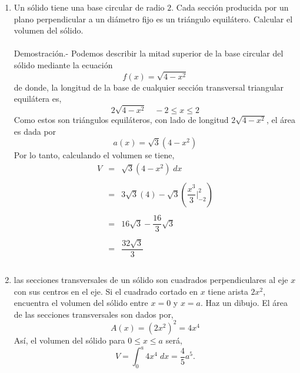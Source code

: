 \begin{enumerate}[ \bfseries 1.]
    \item Un sólido tiene una base circular de radio $2$. Cada sección producida por un plano perpendicular a un diámetro fijo es un triángulo equilátero. Calcular el volumen del sólido.\\\\
	Demostración.-\; Podemos describir la mitad superior de la base circular del sólido mediante la ecuación
	$$f(x)=\sqrt{4-x^2}$$
	de donde, la longitud de la base de cualquier sección transversal triangular equilátera es,
	$$2\sqrt{4-x^2}\quad -2\leq x \leq 2$$
	Como estos son triángulos equiláteros, con lado de longitud $2\sqrt{4-x^2}$, el área es dada por 
	$$a(x) = \sqrt{3}(4-x^2)$$
	Por lo tanto, calculando el volumen se tiene,
	$$\begin{array}{rcl}
	    V&=&\sqrt{3}(4-x^2)\; dx\\\\
	     &=&3\sqrt{3}(4) - \sqrt{3}\left(\dfrac{x^3}{3}\bigg|_{-2}^2\right)\\\\
	     &=&16\sqrt{3} - \dfrac{16}{3}\sqrt{3}\\\\
	     &=&\dfrac{32\sqrt{3}}{3}\\\\
	\end{array}$$
	\vspace{0.5cm}

    \item las secciones transversales de un sólido son cuadrados perpendiculares al eje $x$ con sus centros en el eje. Si el cuadrado cortado en $x$ tiene arista $2x^2$, encuentra el volumen del sólido entre $x = 0$ y $x = a$. Haz un dibujo.
	El área de las secciones transversales son dados por,
	$$A(x) = (2x^2)^2 = 4x^4$$
	Así, el volumen del sólido para $0\leq x \leq a$ será,
	$$V=\int_0^a 4x^4\; dx = \dfrac{4}{5}a^5.$$\\


\end{enumerate}
